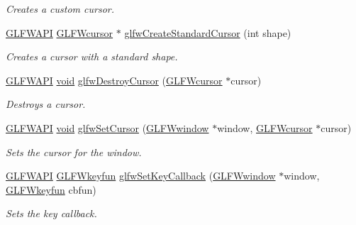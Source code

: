 \begin{DoxyCompactItemize}
\begin{DoxyCompactList}\small\item\em Creates a custom cursor. \end{DoxyCompactList}\item 
\mbox{\hyperlink{glfw3_8h_a56da5036b2cc259351ae22fd6439bb47}{G\+L\+F\+W\+A\+PI}} \mbox{\hyperlink{glfw3_8h_a89261ae18c75e863aaf2656ecdd238f4}{G\+L\+F\+Wcursor}} $\ast$ \mbox{\hyperlink{group__input_ga969dd87ad2ddbf3e1086cc40f235eed1}{glfw\+Create\+Standard\+Cursor}} (int shape)
\begin{DoxyCompactList}\small\item\em Creates a cursor with a standard shape. \end{DoxyCompactList}\item 
\mbox{\hyperlink{glfw3_8h_a56da5036b2cc259351ae22fd6439bb47}{G\+L\+F\+W\+A\+PI}} \mbox{\hyperlink{glad_8h_a950fc91edb4504f62f1c577bf4727c29}{void}} \mbox{\hyperlink{group__input_ga27556b7122117bc1bbb4bb3cc003ea43}{glfw\+Destroy\+Cursor}} (\mbox{\hyperlink{glfw3_8h_a89261ae18c75e863aaf2656ecdd238f4}{G\+L\+F\+Wcursor}} $\ast$cursor)
\begin{DoxyCompactList}\small\item\em Destroys a cursor. \end{DoxyCompactList}\item 
\mbox{\hyperlink{glfw3_8h_a56da5036b2cc259351ae22fd6439bb47}{G\+L\+F\+W\+A\+PI}} \mbox{\hyperlink{glad_8h_a950fc91edb4504f62f1c577bf4727c29}{void}} \mbox{\hyperlink{group__input_gafaf103cea2f43530cff7de4e01126a4f}{glfw\+Set\+Cursor}} (\mbox{\hyperlink{group__window_ga3c96d80d363e67d13a41b5d1821f3242}{G\+L\+F\+Wwindow}} $\ast$window, \mbox{\hyperlink{glfw3_8h_a89261ae18c75e863aaf2656ecdd238f4}{G\+L\+F\+Wcursor}} $\ast$cursor)
\begin{DoxyCompactList}\small\item\em Sets the cursor for the window. \end{DoxyCompactList}\item 
\mbox{\hyperlink{glfw3_8h_a56da5036b2cc259351ae22fd6439bb47}{G\+L\+F\+W\+A\+PI}} \mbox{\hyperlink{group__input_ga0192a232a41e4e82948217c8ba94fdfd}{G\+L\+F\+Wkeyfun}} \mbox{\hyperlink{group__input_gaa73bb92f628a2a0be9c132d56f19362c}{glfw\+Set\+Key\+Callback}} (\mbox{\hyperlink{group__window_ga3c96d80d363e67d13a41b5d1821f3242}{G\+L\+F\+Wwindow}} $\ast$window, \mbox{\hyperlink{group__input_ga0192a232a41e4e82948217c8ba94fdfd}{G\+L\+F\+Wkeyfun}} cbfun)
\begin{DoxyCompactList}\small\item\em Sets the key callback. \end{DoxyCompactList}\item 

\end{DoxyCompactItemize}
